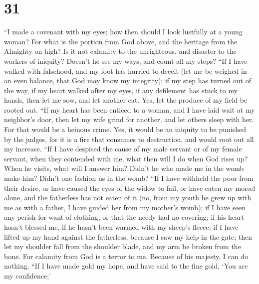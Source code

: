 \hypertarget{section-30}{%
\section{31}\label{section-30}}

 ``I made a covenant with my eyes; how then should I look
lustfully at a young woman?  For what is the portion from
God above, and the heritage from the Almighty on high?  Is
it not calamity to the unrighteous, and disaster to the workers of
iniquity?  Doesn't he see my ways, and count all my steps?
 ``If I have walked with falsehood, and my foot has
hurried to deceit  (let me be weighed in an even balance,
that God may know my integrity);  if my step has turned
out of the way, if my heart walked after my eyes, if any defilement has
stuck to my hands,  then let me sow, and let another eat.
Yes, let the produce of my field be rooted out.  ``If my
heart has been enticed to a woman, and I have laid wait at my neighbor's
door,  then let my wife grind for another, and let others
sleep with her.  For that would be a heinous crime. Yes,
it would be an iniquity to be punished by the judges, 
for it is a fire that consumes to destruction, and would root out all my
increase.  ``If I have despised the cause of my male
servant or of my female servant, when they contended with me,
 what then will I do when God rises up? When he visits,
what will I answer him?  Didn't he who made me in the
womb make him? Didn't one fashion us in the womb?  ``If I
have withheld the poor from their desire, or have caused the eyes of the
widow to fail,  or have eaten my morsel alone, and the
fatherless has not eaten of it  (no, from my youth he
grew up with me as with a father, I have guided her from my mother's
womb);  if I have seen any perish for want of clothing,
or that the needy had no covering;  if his heart hasn't
blessed me, if he hasn't been warmed with my sheep's fleece;
 if I have lifted up my hand against the fatherless,
because I saw my help in the gate;  then let my shoulder
fall from the shoulder blade, and my arm be broken from the bone.
 For calamity from God is a terror to me. Because of his
majesty, I can do nothing.  ``If I have made gold my
hope, and have said to the fine gold, `You are my confidence;'
